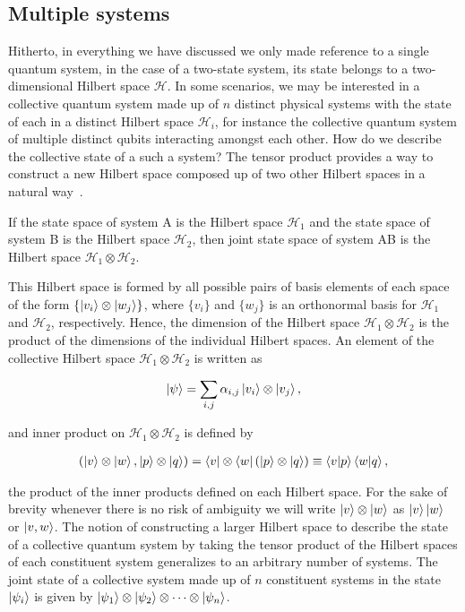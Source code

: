 \subsection{Multiple systems}
Hitherto, in everything we have discussed we only made reference to a single quantum system, in the case of a two-state system, its state belongs to a two-dimensional Hilbert space $\mathcal{H}$. In some scenarios, we may be interested in a collective quantum system made up of $n$ distinct physical systems with the state of each in a distinct Hilbert space $\mathcal{H}_i$, for instance the collective quantum system of multiple distinct qubits interacting amongst each other. How do we describe the collective state of a such a system? The tensor product provides a way to construct a new Hilbert space composed up of two other Hilbert spaces in a natural way~\cite{Mike&Ike}. 

\bigskip
\noindent
If the state space of system A is the Hilbert space $\mathcal{H}_1$ and the state space of system B is the Hilbert space $\mathcal{H}_2$, then joint state space of system AB is the Hilbert space $\mathcal{H}_1\otimes\mathcal{H}_2$. 

\clearpage
\noindent
This Hilbert space is formed by all possible pairs of basis elements of each space of the form $\{\ket{v_i}\otimes\ket{w_j}\}$, where $\{v_i\}$ and $\{w_j\}$ is an orthonormal basis for $\mathcal{H}_1$ and $\mathcal{H}_2$, respectively. Hence, the dimension of the Hilbert space $\mathcal{H}_1\otimes\mathcal{H}_2$ is the product of the dimensions of the individual Hilbert spaces. An element of the collective Hilbert space $\mathcal{H}_1\otimes\mathcal{H}_2$ is written as

\begin{align}
	\ket{\psi} = \displaystyle\sum_{i,j} \alpha_{i,j} \ket{v_i} \otimes \ket{v_j},
\end{align}

\noindent
and inner product on $\mathcal{H}_1\otimes\mathcal{H}_2$ is defined by

\begin{align}
	(\ket{v}\otimes\ket{w}, \ket{p}\otimes\ket{q}) = \bra{v}\otimes\bra{w} (\ket{p}\otimes\ket{q}) \equiv \braket{v}{p}\braket{w}{q},
\end{align}

\noindent
the product of the inner products defined on each Hilbert space. For the sake of brevity whenever there is no risk of ambiguity we will write $\ket{v}\otimes\ket{w}$ as $\ket{v}\ket{w}$ or $\ket{v,w}$. The notion of constructing a larger Hilbert space to describe the state of a collective quantum system by taking the tensor product of the Hilbert spaces of each constituent system generalizes to an arbitrary number of systems. The joint state of a collective system made up of $n$ constituent systems in the state $\ket{\psi_i}$ is given by $\ket{\psi_1}\otimes\ket{\psi_2} \otimes \cdots \otimes \ket{\psi_n}$.



